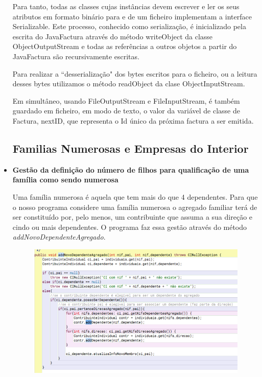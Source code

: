 \documentclass[a4paper]{article}
\begin{document}
\begin{itemize}
Para tanto, todas as classes cujas instâncias devem escrever e ler os seus atributos
em formato binário para e de um ficheiro implementam a interface Serializable. Este
processo, conhecido como serialização, é inicializado pela escrita do JavaFactura através
do método \textsf{writeObject} da classe ObjectOutputStream e todas as referências a outros objetos
a partir do JavaFactura são recursivamente escritas.

Para realizar a ``desserialização" dos bytes escritos para o ficheiro, ou a leitura desses bytes
utilizamos o método \textsf{readObject} da clase ObjectInputStream. \par

Em simultâneo, usando FileOutputStream e FileInputStream, é também guardado em
ficheiro, em modo de texto, o valor da variável de classe de Factura, nextID,
que representa o Id único da próxima factura a ser emitida.
\vspace{1.5cm}



\subsection{Familias Numerosas e Empresas do Interior}
\label{sec:familiaNumerosa_EmpresasInterior}


\item\textbf{Gestão da definição do número de filhos para qualificação de uma
família como sendo numerosa}
\vspace{0.5cm}

Uma família numerosa é aquela que tem mais do que 4 dependentes. Para que o nosso
programa considere uma família numerosa o agregado familiar terá de ser constituído
por, pelo menos, um contribuinte que assuma a sua direção e cindo ou mais dependentes.
O programa faz essa gestão através do método \emph{addNovoDependenteAgregado}.

\vspace{0.5cm}
\begin{figure}[H]
\centering
\includegraphics[scale=0.35]{imgs/addDependente1.png}
\label{img:addDependente1}
\end{figure}


\end{itemize}
\end{document}
